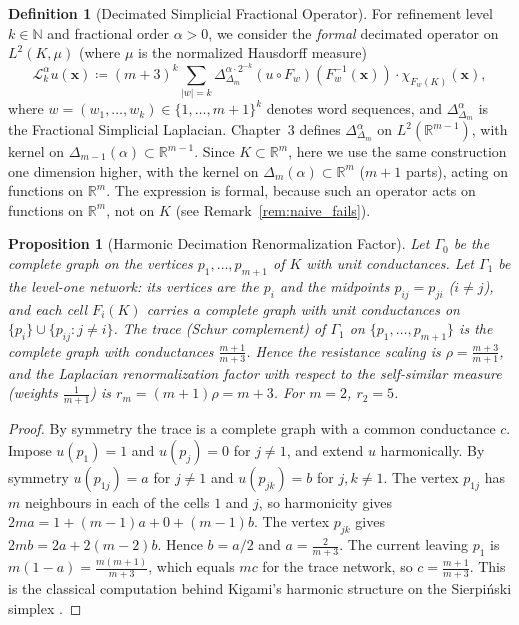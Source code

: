 \documentclass[11pt,a4paper]{article}
\theoremstyle{plain}
\newtheorem{proposition}[theorem]{Proposition}
\theoremstyle{definition}
\newtheorem{definition}[theorem]{Definition}
\theoremstyle{remark}
\numberwithin{equation}{section}
\begin{document}
\begin{definition}[Decimated Simplicial Fractional Operator]
For refinement level $k \in \mathbb{N}$ and fractional order $\alpha > 0$, we consider the \emph{formal} decimated operator on $L^2(K, \mu)$ (where $\mu$ is the normalized Hausdorff measure)
\begin{equation}
\label{eq:decimated_op}
\mathcal{L}_k^\alpha u(\mathbf{x}) \coloneqq (m+3)^k \sum_{|w|=k} \Delta_{\Delta_m}^{\alpha \cdot 2^{-k}} \left(u \circ F_w\right)\left(F_w^{-1}(\mathbf{x})\right) \cdot \chi_{F_w(K)}(\mathbf{x}),
\end{equation}
where $w = (w_1, \dots, w_k) \in \{1, \dots, m+1\}^k$ denotes word sequences, and $\Delta_{\Delta_m}^\alpha$ is the Fractional Simplicial Laplacian. Chapter~3 defines $\Delta^\alpha_{\Delta_m}$ on $L^2(\mathbb{R}^{m-1})$, with kernel on $\Delta_{m-1}(\alpha) \subset \mathbb{R}^{m-1}$. Since $K \subset \mathbb{R}^m$, here we use the same construction one dimension higher, with the kernel on $\Delta_m(\alpha) \subset \mathbb{R}^m$ ($m+1$ parts), acting on functions on $\mathbb{R}^m$. The expression is formal, because such an operator acts on functions on $\mathbb{R}^m$, not on $K$ (see Remark~\ref{rem:naive_fails}).
\end{definition}

\begin{proposition}[Harmonic Decimation Renormalization Factor]
\label{assump:kigami_decimation}
Let $\Gamma_0$ be the complete graph on the vertices $p_1, \dots, p_{m+1}$ of $K$ with unit conductances. Let $\Gamma_1$ be the level-one network: its vertices are the $p_i$ and the midpoints $p_{ij} = p_{ji}$ ($i \ne j$), and each cell $F_i(K)$ carries a complete graph with unit conductances on $\{p_i\} \cup \{p_{ij} : j \ne i\}$. The trace (Schur complement) of $\Gamma_1$ on $\{p_1, \dots, p_{m+1}\}$ is the complete graph with conductances $\frac{m+1}{m+3}$. Hence the resistance scaling is $\rho = \frac{m+3}{m+1}$, and the Laplacian renormalization factor with respect to the self-similar measure (weights $\frac{1}{m+1}$) is $r_m = (m+1)\rho = m+3$. For $m = 2$, $r_2 = 5$.
\end{proposition}
\begin{proof}
By symmetry the trace is a complete graph with a common conductance $c$. Impose $u(p_1) = 1$ and $u(p_j) = 0$ for $j \ne 1$, and extend $u$ harmonically. By symmetry $u(p_{1j}) = a$ for $j \ne 1$ and $u(p_{jk}) = b$ for $j, k \ne 1$. The vertex $p_{1j}$ has $m$ neighbours in each of the cells $1$ and $j$, so harmonicity gives $2ma = 1 + (m-1)a + 0 + (m-1)b$. The vertex $p_{jk}$ gives $2mb = 2a + 2(m-2)b$. Hence $b = a/2$ and $a = \frac{2}{m+3}$. The current leaving $p_1$ is $m(1 - a) = \frac{m(m+1)}{m+3}$, which equals $mc$ for the trace network, so $c = \frac{m+1}{m+3}$. This is the classical computation behind Kigami's harmonic structure on the Sierpi\'nski simplex \cite{kigami2001}.
\end{proof}
\end{document}
